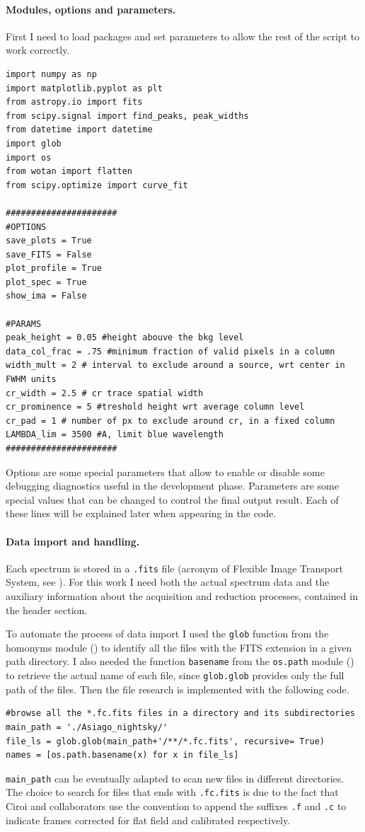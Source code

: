 \paragraph{Modules, options and parameters.}
First I need to load packages and set parameters to allow the rest of the script to work correctly.
\begin{lstlisting}
import numpy as np
import matplotlib.pyplot as plt
from astropy.io import fits
from scipy.signal import find_peaks, peak_widths
from datetime import datetime
import glob
import os
from wotan import flatten
from scipy.optimize import curve_fit

######################
#OPTIONS
save_plots = True
save_FITS = False
plot_profile = True
plot_spec = True
show_ima = False

#PARAMS
peak_height = 0.05 #height abouve the bkg level
data_col_frac = .75 #minimum fraction of valid pixels in a column
width_mult = 2 # interval to exclude around a source, wrt center in FWHM units
cr_width = 2.5 # cr trace spatial width
cr_prominence = 5 #treshold height wrt average column level
cr_pad = 1 # number of px to exclude around cr, in a fixed column
LAMBDA_lim = 3500 #A, limit blue wavelength
######################
\end{lstlisting}
Options are some special parameters that allow to enable or disable some debugging diagnostics useful in the development phase. Parameters are some special values that can be changed to control the final output result. Each of these lines will be explained later when appearing in the code.

\paragraph{Data import and handling.} Each spectrum is stored in a \texttt{.fits} file (acronym of Flexible Image Transport System, see ). For this work I need both the actual spectrum data and the auxiliary information about the acquisition and reduction processes, contained in the header section.

To automate the process of data import I used the \texttt{glob} function from the homonyms module () to identify all the files with the FITS extension in a given path directory. I also needed the function \texttt{basename} from the \texttt{os.path} module () to retrieve the actual name of each file, since \texttt{glob.glob} provides only the full path of the files. Then the file research is implemented with the following code.
\begin{lstlisting}
#browse all the *.fc.fits files in a directory and its subdirectories
main_path = './Asiago_nightsky/'
file_ls = glob.glob(main_path+'/**/*.fc.fits', recursive= True)
names = [os.path.basename(x) for x in file_ls]
\end{lstlisting}
\texttt{main\_path} can be eventually adapted to scan new files in different directories. The choice to search for files that ends with \texttt{.fc.fits} is due to the fact that Ciroi and collaborators use the convention to append the suffixes \texttt{.f} and \texttt{.c} to indicate frames corrected for flat field and calibrated respectively.

